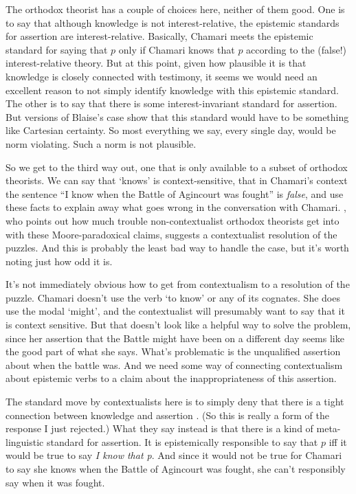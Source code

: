 \documentclass[11pt,]{book}
\begin{document}
The orthodox theorist has a couple of choices here, neither of them good. One is to say that although knowledge is not interest-relative, the epistemic standards for assertion are interest-relative. Basically, Chamari meets the epistemic standard for saying that \(p\) only if Chamari knows that \(p\) according to the (false!) interest-relative theory. But at this point, given how plausible it is that knowledge is closely connected with testimony, it seems we would need an excellent reason to not simply identify knowledge with this epistemic standard. The other is to say that there is some interest-invariant standard for assertion. But versions of Blaise's case show that this standard would have to be something like Cartesian certainty. So most everything we say, every single day, would be norm violating. Such a norm is not plausible.

So we get to the third way out, one that is only available to a subset of orthodox theorists. We can say that `knows' is context-sensitive, that in Chamari's context the sentence ``I know when the Battle of Agincourt was fought'' is \emph{false}, and use these facts to explain away what goes wrong in the conversation with Chamari. \citet{ArmourGarb2011}, who points out how much trouble non-contextualist orthodox theorists get into with these Moore-paradoxical claims, suggests a contextualist resolution of the puzzles. And this is probably the least bad way to handle the case, but it's worth noting just how odd it is.

It's not immediately obvious how to get from contextualism to a resolution of the puzzle. Chamari doesn't use the verb `to know' or any of its cognates. She does use the modal `might', and the contextualist will presumably want to say that it is context sensitive. But that doesn't look like a helpful way to solve the problem, since her assertion that the Battle might have been on a different day seems like the good part of what she says. What's problematic is the unqualified assertion about when the battle was. And we need some way of connecting contextualism about epistemic verbs to a claim about the inappropriateness of this assertion.

The standard move by contextualists here is to simply deny that there is a tight connection between knowledge and assertion \citep{DeRose2002, Cohen2004}. (So this is really a form of the response I just rejected.) What they say instead is that there is a kind of meta-linguistic standard for assertion. It is epistemically responsible to say that \(p\) iff it would be true to say \emph{I know that p}. And since it would not be true for Chamari to say she knows when the Battle of Agincourt was fought, she can't responsibly say when it was fought.
\end{document}
